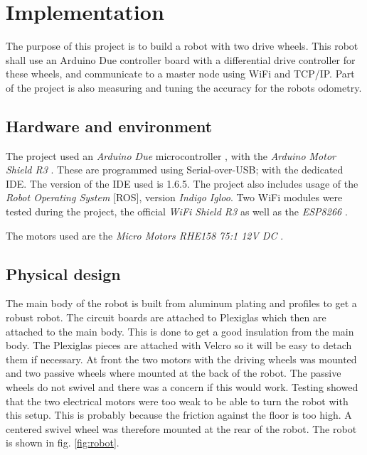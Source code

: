 \documentclass[11pt]{article}
\begin{document}
\section{Implementation}
The purpose of this project is to build a robot with two drive wheels. This robot shall use an Arduino Due controller board with a differential drive controller for these wheels, and communicate to a master node using WiFi and TCP/IP. Part of the project is also measuring and tuning the accuracy for the robots odometry.\par


\subsection{Hardware and environment}
The project used an \emph{Arduino Due} microcontroller \cite{arduinodue}, with the \emph{Arduino Motor Shield R3} \cite{motorshield}. These are programmed using Serial-over-USB; with the dedicated IDE. The version of the IDE used is 1.6.5. The project also includes usage of the \emph{Robot Operating System} [ROS], version \emph{Indigo Igloo}. Two WiFi modules were tested during the project, the official \emph{WiFi Shield  R3} \cite{wifishield} as well as the \emph{ESP8266} \cite{ESP8266}. \par

  The motors used are the \emph{Micro Motors RHE158 75:1 12V DC} \cite{motors}.

\subsection{Physical design}
The main body of the robot is built from aluminum plating and profiles to get a robust robot. The circuit boards are attached to Plexiglas which then are attached to the main body. This is done to get a good insulation from the main body. The Plexiglas pieces are attached with Velcro so it will be easy to detach them if necessary. At front the two motors with the driving wheels was mounted and two passive wheels where mounted at the back of the robot. The passive wheels do not swivel and there was a concern if this would work. Testing showed that the two electrical motors  were too weak to be able to turn the robot with this setup. This is probably because the friction against the floor is too high. A centered swivel wheel was therefore mounted at the rear of the robot. The robot is shown in fig. \vref{fig:robot}. \par
\end{document}

